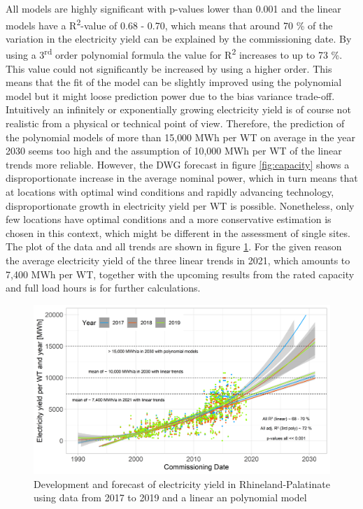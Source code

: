 \documentclass[a4paper,11pt]{article}
\begin{document}
All models are highly significant with p-values lower than 0.001 and the linear models have a R\textsuperscript{2}-value of 0.68 - 0.70, which means that around 70 \% of the variation in the electricity yield can be explained by the commissioning date. By using a 3\textsuperscript{rd} order polynomial formula the value for R\textsuperscript{2} increases to up to 73 \%. This value could not significantly be increased by using a higher order. This means that the fit of the model can be slightly improved using the polynomial model but it might loose prediction power due to the bias variance trade-off. Intuitively an infinitely or exponentially growing electricity yield is of course not realistic from a physical or technical point of view. Therefore, the prediction of the polynomial models of more than 15,000 MWh per WT on average in the year 2030 seems too high and the assumption of 10,000 MWh per WT of the linear trends more reliable. However, the DWG forecast in figure \ref{fig:capacity} shows a disproportionate increase in the average nominal power, which in turn means that at locations with optimal wind conditions and rapidly advancing technology, disproportionate growth in electricity yield per WT is possible. Nonetheless, only few locations have optimal conditions and a more conservative estimation is chosen in this context, which might be different in the assessment of single sites. The plot of the data and all trends are shown in figure \ref{fig:electricityyield}. For the given reason the average electricity yield of the three linear trends in 2021, which amounts to 7,400 MWh per WT, together with the upcoming results from the rated capacity and full load hours is for further calculations.
\begin{figure}

{\centering \includegraphics[width=1\linewidth]{data/Amprion/results_of_analysis/electricity_yield_2017-2019_rlp_over_comissioning_date2} 

}

\caption{Development and forecast of electricity yield in Rhineland-Palatinate using data from 2017 to 2019 and a linear an polynomial model}\label{fig:electricityyield}
\end{figure}
\end{document}
